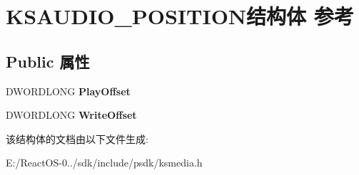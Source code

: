 \hypertarget{struct_k_s_a_u_d_i_o___p_o_s_i_t_i_o_n}{}\section{K\+S\+A\+U\+D\+I\+O\+\_\+\+P\+O\+S\+I\+T\+I\+O\+N结构体 参考}
\label{struct_k_s_a_u_d_i_o___p_o_s_i_t_i_o_n}
\subsection*{Public 属性}
\begin{DoxyCompactItemize}
\item 
\mbox{\label{struct_k_s_a_u_d_i_o___p_o_s_i_t_i_o_n_ab8d1aec9b5d92cadb62351c578cfb391}} 
D\+W\+O\+R\+D\+L\+O\+NG {\bfseries Play\+Offset}
\item 
\mbox{\label{struct_k_s_a_u_d_i_o___p_o_s_i_t_i_o_n_a47768664ecfd962c7e926e5fdee573c1}} 
D\+W\+O\+R\+D\+L\+O\+NG {\bfseries Write\+Offset}
\end{DoxyCompactItemize}


该结构体的文档由以下文件生成\+:\begin{DoxyCompactItemize}
\item 
E\+:/\+React\+O\+S-\/0../sdk/include/psdk/ksmedia.\+h\end{DoxyCompactItemize}
